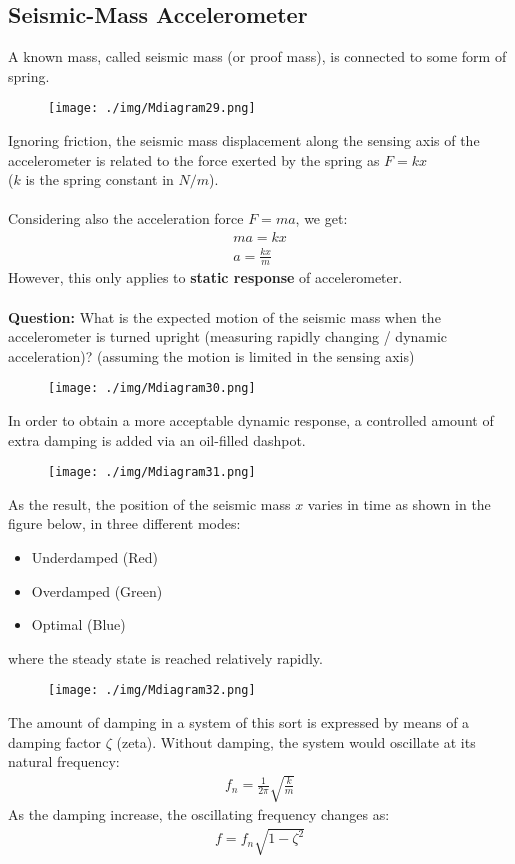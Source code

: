 \subsection{Seismic-Mass Accelerometer}
A known mass, called seismic mass (or proof mass), is connected to some form of spring.
\begin{figure}[H]
  \centering
  \texttt{[image: ./img/Mdiagram29.png]}
\end{figure}
Ignoring friction, the seismic mass displacement along the sensing axis of the accelerometer is related to the force exerted by the spring as $F = kx$ \\
($k$ is the spring constant in $N/m$). \\\\
Considering also the acceleration force $F = ma$, we get:
\begin{gather}
  ma = kx \\
  a = \frac{kx}{m}
\end{gather}
However, this only applies to \textbf{static response} of accelerometer. \\\\
\textbf{Question:} What is the expected motion of the seismic mass when the accelerometer is turned upright (measuring rapidly changing / dynamic acceleration)? (assuming the motion is limited in the sensing axis)
\begin{figure}[H]
  \centering
  \texttt{[image: ./img/Mdiagram30.png]}
\end{figure}
In order to obtain a more acceptable dynamic response, a controlled amount of extra damping is added via an oil-filled dashpot.
\begin{figure}[H]
  \centering
  \texttt{[image: ./img/Mdiagram31.png]}
\end{figure}
As the result, the position of the seismic mass $x$ varies in time as shown in the figure below, in three different modes:
\begin{itemize}
  \item Underdamped (Red)
  \item Overdamped (Green)
  \item Optimal (Blue)
\end{itemize}
where the steady state is reached relatively rapidly.
\begin{figure}[H]
  \centering
  \texttt{[image: ./img/Mdiagram32.png]}
\end{figure}
The amount of damping in a system of this sort is expressed by means of a damping factor $\zeta$ (zeta). Without damping, the system would oscillate at its natural frequency:
\begin{gather}
  f_n = \frac{1}{2\pi}\sqrt{\frac{k}{m}}
\end{gather}
As the damping increase, the oscillating frequency changes as:
\begin{gather}
  f = f_n\sqrt{1-\zeta^2}
\end{gather}
